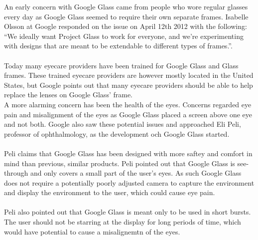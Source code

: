 An early concern with Google Glass came from people who wore regular glasses every day as Google Glass seemed to require their own separate frames. Isabelle Olsson at Google responded on the issue on April 12th 2012 with the following: ``We ideally want Project Glass to work for everyone, and we're experimenting with designs that are meant to be extendable to different types of frames.''.\cite{GoogleGlassFrameResponse}
\\
\\
Today many eyecare providers have been trained for Google Glass and Glass frames. These trained eyecare providers are however mostly located in the United States,\cite{frameProviders} but Google points out that many eyecare providers should be able to help replace the lenses on Google Glass' frame\cite{framesGlass}.\
\ 
\\
A more alarming concern has been the health of the eyes. \cite{ackerman13} Concerns regarded eye pain and misalignment of the eyes as Google Glass placed a screen above one eye and not both. Google also saw these potential issues and approached Eli Peli, professor of ophthalmology, as the development och Google Glass started.
\\
\\
Peli claims that Google Glass has been designed with more saftey and comfort in mind than previous, similar products. Peli pointed out that Google Glass is see-through and only covers a small part of the user's eyes. As such Google Glass does not require a potentially poorly adjusted camera to capture the environment and display the environment to the user, which could cause eye pain.
\\
\\
Peli also pointed out that Google Glass is meant only to be used in short bursts. The user should not be starring at the display for long periods of time, which would have potential to cause a misalignemtn of the eyes.
\\
\\
%
